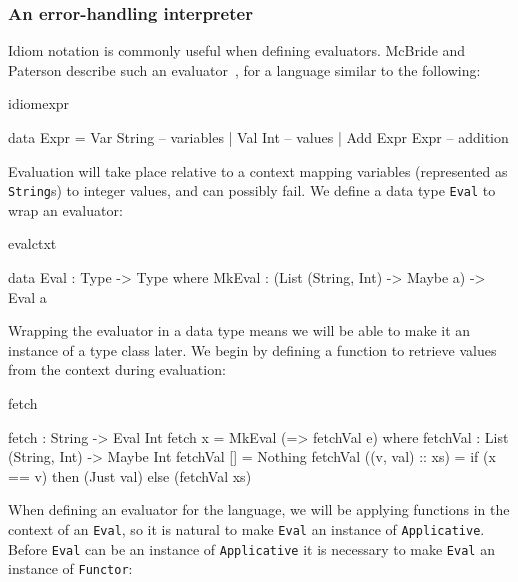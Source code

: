 \subsubsection{An error-handling interpreter}

Idiom notation is commonly useful when defining evaluators. McBride and
Paterson describe such an evaluator~\cite{idioms}, for a language similar to
the following:

\begin{SaveVerbatim}{idiomexpr}

data Expr = Var String      -- variables
          | Val Int         -- values
          | Add Expr Expr   -- addition

\end{SaveVerbatim}

\noindent
Evaluation will take place relative to a context mapping variables (represented as
\texttt{String}s) to integer values, and can possibly fail. We define a data type
\texttt{Eval} to wrap an evaluator:

\begin{SaveVerbatim}{evalctxt}

data Eval : Type -> Type where
     MkEval : (List (String, Int) -> Maybe a) -> Eval a

\end{SaveVerbatim}

\noindent
Wrapping the evaluator in a data type means we will be able to make it an instance
of a type class later. We begin by defining a function to retrieve values from
the context during evaluation:

\begin{SaveVerbatim}{fetch}

fetch : String -> Eval Int
fetch x = MkEval (\e => fetchVal e) where
    fetchVal : List (String, Int) -> Maybe Int
    fetchVal [] = Nothing
    fetchVal ((v, val) :: xs) = if (x == v) then (Just val) else (fetchVal xs)
  
\end{SaveVerbatim}
  
\noindent
When defining an evaluator for the language, we will be applying functions in
the context of an \texttt{Eval}, so it is natural to make \texttt{Eval} an
instance of \texttt{Applicative}.
Before \texttt{Eval} can be an instance of
\texttt{Applicative} it is necessary to make \texttt{Eval} an instance of
\texttt{Functor}:

\useverb{}

